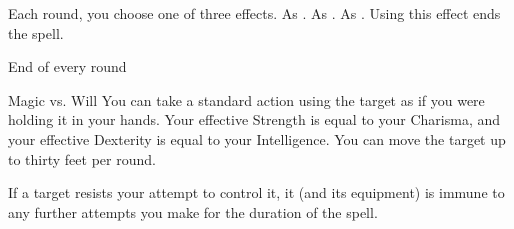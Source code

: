 \begin{comment}
\subsubsection{T}
\end{comment}

\begin{spellheader}
    \spellrng{\rngmed}
\end{spellheader}
\begin{spelleffects}
    \spellspecial Each round, you choose one of three effects.
     As .
     As .
     As . Using this effect ends the spell.
\end{spelleffects}
\begin{spellfooter}

\end{spellfooter}

\begin{spellheader}
    \spellrng{\rngmed}
\end{spellheader}
\begin{spelleffects}
    \begin{spelltrigger}{End of every round}
        \begin{spellattack}{Magic vs. Will}
            \spellsuccess You can take a standard action using the target as if you were holding it in your hands. Your effective Strength is equal to your Charisma, and your effective Dexterity is equal to your Intelligence. You can move the target up to thirty feet per round.
        \end{spellattack}
    \end{spelltrigger}
\end{spelleffects}
\begin{spellfooter}
    \spellnotes If a target resists your attempt to control it, it (and its equipment) is immune to any further attempts you make for the duration of the spell.
\end{spellfooter}

